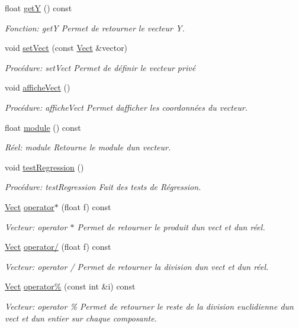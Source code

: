 \begin{DoxyCompactItemize}
float \hyperlink{classVect_a2e44111683aae147cd053ac6002f5992}{getY} () const
\begin{DoxyCompactList}\small\item\em Fonction\+: getY Permet de retourner le vecteur Y. \end{DoxyCompactList}\item 
void \hyperlink{classVect_a28408435bc900905d3416aef70140cd9}{set\+Vect} (const \hyperlink{classVect}{Vect} \&vector)
\begin{DoxyCompactList}\small\item\em Procédure\+: set\+Vect Permet de définir le vecteur privé \end{DoxyCompactList}\item 
void \hyperlink{classVect_afba6ce27d6700dddeb9272cdf39c66e3}{affiche\+Vect} ()
\begin{DoxyCompactList}\small\item\em Procédure\+: affiche\+Vect Permet d\textquotesingle{}afficher les coordonnées du vecteur. \end{DoxyCompactList}\item 
float \hyperlink{classVect_aa61c71b79a4d2f2cda092648a7268c4f}{module} () const
\begin{DoxyCompactList}\small\item\em Réel\+: module Retourne le module d\textquotesingle{}un vecteur. \end{DoxyCompactList}\item 
void \hyperlink{classVect_a734074001bba32f3d76e5cee612864f1}{test\+Regression} ()
\begin{DoxyCompactList}\small\item\em Procédure\+: test\+Regression Fait des tests de Régression. \end{DoxyCompactList}\item 
\hyperlink{classVect}{Vect} \hyperlink{classVect_a81581552ec69c7a0006837148141232e}{operator$\ast$} (float f) const
\begin{DoxyCompactList}\small\item\em Vecteur\+: operator $\ast$ Permet de retourner le produit d\textquotesingle{}un vect et d\textquotesingle{}un réel. \end{DoxyCompactList}\item 
\hyperlink{classVect}{Vect} \hyperlink{classVect_a5fcad4106fa5eb9826f7259f3509599e}{operator/} (float f) const
\begin{DoxyCompactList}\small\item\em Vecteur\+: operator / Permet de retourner la division d\textquotesingle{}un vect et d\textquotesingle{}un réel. \end{DoxyCompactList}\item 
\hyperlink{classVect}{Vect} \hyperlink{classVect_a7c95db0096c212593a83992d8c9cc42a}{operator\%} (const int \&i) const
\begin{DoxyCompactList}\small\item\em Vecteur\+: operator \% Permet de retourner le reste de la division euclidienne d\textquotesingle{}un vect et d\textquotesingle{}un entier sur chaque composante. \end{DoxyCompactList}\end{DoxyCompactItemize}


